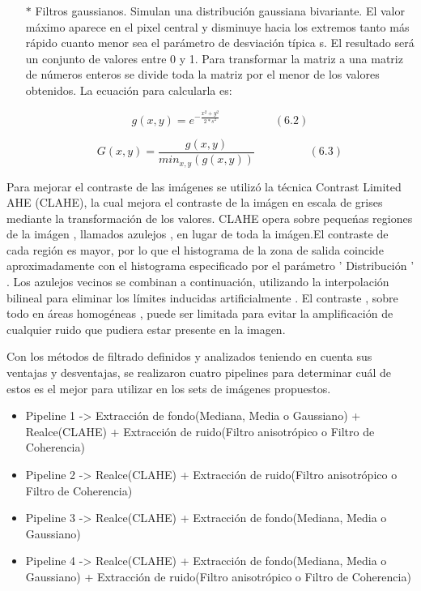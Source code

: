 \begin{itemize}
	\item[$*$]Filtros gaussianos. Simulan una distribución gaussiana bivariante. El valor máximo aparece en el pixel central y disminuye hacia los extremos tanto más rápido cuanto menor sea el parámetro de desviación típica s. El resultado será un conjunto de valores entre 0 y 1. Para transformar la matriz a una matriz de números enteros se divide toda la matriz por el menor de los valores obtenidos. La ecuación para calcularla es:
	
	\begin{displaymath}
	g(x,y)=e^{-\frac{x^2+y^2}{2\ast s^2}} \hspace{2cm}(6.2)
	\end{displaymath}
	
	\begin{displaymath}
		G(x,y)=\frac{g(x,y)}{min_{x,y}(g(x,y))} \hspace{2cm}(6.3)
	\end{displaymath}
\end{itemize}


Para mejorar el contraste de las im\'agenes se utiliz\'o la t\'ecnica Contrast Limited AHE (CLAHE), la cual mejora el contraste  de la im\'agen en escala de grises mediante la transformaci\'on de los valores. CLAHE opera sobre peque\'nas regiones de la im\'agen , llamados azulejos , en lugar de toda la im\'agen.El contraste de cada regi\'on es mayor, por lo que el histograma de la zona de salida coincide aproximadamente con el histograma especificado por el parámetro ' Distribución ' . Los azulejos vecinos se combinan a continuación, utilizando la interpolación bilineal para eliminar los límites inducidas artificialmente . El contraste , sobre todo en áreas homogéneas , puede ser limitada para evitar la amplificación de cualquier ruido que pudiera estar presente en la imagen.


Con los métodos de filtrado definidos y analizados teniendo en cuenta sus ventajas y desventajas, se realizaron cuatro pipelines para determinar cu\'al de estos es el mejor para utilizar en los sets de im\'agenes propuestos.

\begin{itemize}
	    \item Pipeline 1 -> Extracci\'on de fondo(Mediana, Media o Gaussiano)  +  Realce(CLAHE)  +  Extracci\'on de ruido(Filtro anisotr\'opico o Filtro de Coherencia)
		\item Pipeline 2 -> Realce(CLAHE) +  Extracci\'on de ruido(Filtro anisotr\'opico o Filtro de Coherencia)
		\item Pipeline 3 -> Realce(CLAHE) +  Extracci\'on de fondo(Mediana, Media o Gaussiano)
		\item Pipeline 4 -> Realce(CLAHE)  + Extracci\'on de fondo(Mediana, Media o Gaussiano)   +  Extracci\'on de ruido(Filtro anisotr\'opico o Filtro de Coherencia)
\end{itemize}






